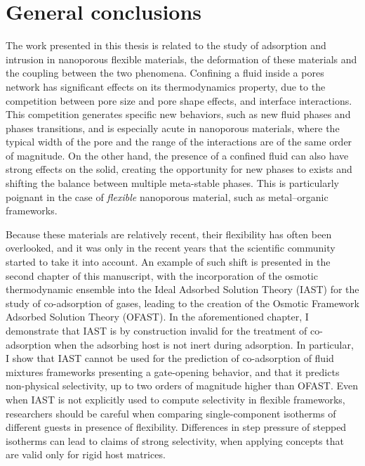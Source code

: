 
\chapter*{General conclusions}


The work presented in this thesis is related to the study of adsorption and
intrusion in nanoporous flexible materials, the deformation of these materials
and the coupling between the two phenomena. Confining a fluid inside a pores
network has significant effects on its thermodynamics property, due to the
competition between pore size and pore shape effects, and interface
interactions. This competition generates specific new behaviors, such as new
fluid phases and phases transitions, and is especially acute in nanoporous
materials, where the typical width of the pore and the range of the interactions
are of the same order of magnitude. On the other hand, the presence of a
confined fluid can also have strong effects on the solid, creating the
opportunity for new phases to exists and shifting the balance between multiple
meta-stable phases. This is particularly poignant in the case of \emph{flexible}
nanoporous material, such as metal--organic frameworks.

Because these materials are relatively recent, their flexibility has often been
overlooked, and it was only in the recent years that the scientific community
started to take it into account. An example of such shift is presented in the
second chapter of this manuscript, with the incorporation of the osmotic
thermodynamic ensemble into the Ideal Adsorbed Solution Theory (IAST) for the
study of co-adsorption of gases, leading to the creation of the Osmotic
Framework Adsorbed Solution Theory (OFAST). In the aforementioned chapter, I
demonstrate that IAST is by construction invalid for the treatment of
co-adsorption when the adsorbing host is not inert during adsorption. In
particular, I show that IAST cannot be used for the prediction of co-adsorption
of fluid mixtures frameworks presenting a gate-opening behavior, and that it
predicts non-physical selectivity, up to two orders of magnitude higher than
OFAST. Even when IAST is not explicitly used to compute selectivity in flexible
frameworks, researchers should be careful when comparing single-component
isotherms of different guests in presence of flexibility. Differences in step
pressure of stepped isotherms can lead to claims of strong selectivity, when
applying concepts that are valid only for rigid host matrices.

